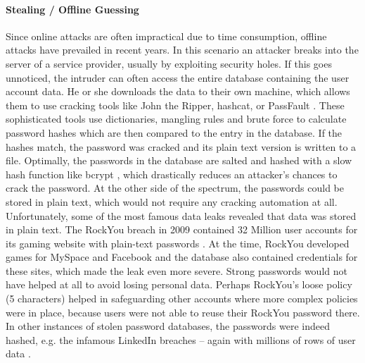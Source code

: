 \paragraph{Stealing / Offline Guessing} Since online attacks are often impractical due to time consumption, offline attacks have prevailed in recent years. 
In this scenario an attacker breaks into the server of a service provider, usually by exploiting security holes. If this goes unnoticed, the intruder can often access the entire database containing the user account data. He or she downloads the data to their own machine, which allows them to use cracking tools like John the Ripper,  hashcat, or PassFault \cite{Paiva2017Passfault}. These sophisticated tools use dictionaries, mangling rules and brute force to calculate password hashes which are then compared to the entry in the database. If the hashes match, the password was cracked and its plain text version is written to a file. 
Optimally, the passwords in the database are salted and hashed with a slow hash function like bcrypt \cite{Provos1999bcrypt}, which drastically reduces an attacker's chances to crack the password. At the other side of the spectrum, the passwords could be stored in plain text, which would not require any cracking automation at all. Unfortunately, some of the most famous data leaks revealed that data was stored in plain text. 
The RockYou breach in 2009 contained 32 Million user accounts for its gaming website with plain-text passwords \cite{Bonneau2012ScienceOfGuessing, Weir2010MetricsPolicies}. At the time, RockYou developed games for MySpace and Facebook and the database also contained credentials for these sites, which made the leak even more severe. Strong passwords would not have helped at all to avoid losing personal data. Perhaps RockYou's loose policy (5 characters) helped in safeguarding other accounts where more complex policies were in place, because users were not able to reuse their RockYou password there. 
In other instances of stolen password databases, the passwords were indeed hashed, e.g. the infamous LinkedIn breaches -- again with millions of rows of user data \cite{Huh2017TooBusy}. 
